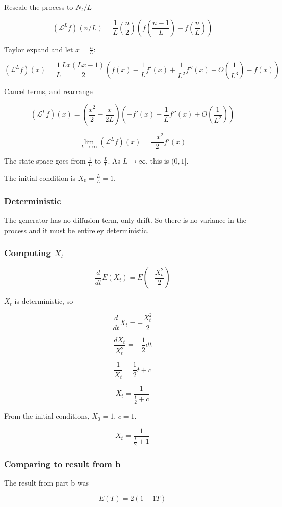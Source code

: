 \documentclass{article}
\begin{document}
Rescale the process to $N_t/L$

$$(\mathcal{L}^Lf)(n/L) = \frac{1}{L} {n\choose2} (f(\frac{n-1}{L}) - f(\frac{n}{L}))$$

Taylor expand and let $x=\frac{n}{L}$:

$$(\mathcal{L}^Lf)(x) = \frac{1}{L}\frac{Lx(Lx-1)}{2} (f(x) - \frac{1}{L}f'(x) + \frac{1}{L^2}f''(x) + O(\frac{1}{L^3}) - f(x))$$

Cancel terms, and rearrange

$$(\mathcal{L}^Lf)(x) = (\frac{x^2}{2} - \frac{x}{2L})(- f'(x) + \frac{1}{L}f''(x) + O(\frac{1}{L^2}))$$

$$\lim_{L \to \infty} (\mathcal{L}^Lf)(x) = \frac{-x^2}{2}f'(x)$$

The state space goes from $\frac{1}{L}$ to $\frac{L}{L}$. As $L \to \infty$, this is $(0,1]$. 

The initial condition is $X_0 = \frac{L}{L} = 1$, 


\subsubsection{Deterministic}

The generator has no diffusion term, only drift. So there is no variance in the process and it must be entireley deterministic. 

\subsubsection{Computing $X_t$}

$$\frac{d}{dt}E(X_t) = E(-\frac{X_t^2}{2})$$

$X_t$ is deterministic, so

$$\frac{d}{dt}X_t = -\frac{X_t^2}{2}$$

$$\frac{dX_t}{X_t^2} = -\frac{1}{2}dt$$


$$\frac{1}{X_t} = \frac{1}{2}t + c$$


$$X_t = \frac{1}{\frac{t}{2}+c}$$

From the initial conditions, $X_0=1$, $c=1$.

$$X_t = \frac{1}{\frac{t}{2}+1}$$

\subsubsection{Comparing to result from b}

The result from part b was

$$E(T) = 2(1 - {1}{T})$$
\end{document}
